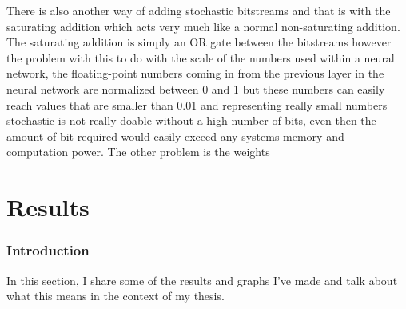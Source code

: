 \documentclass[a4paper,oneside,phd,etd]{BYUPhys}
\begin{document}
There is also another way of adding stochastic bitstreams and that is with the saturating addition which acts very much like a normal non-saturating addition. The saturating addition is simply an OR gate between the bitstreams  however the problem with this to do with the scale of the numbers used within a neural network, the floating-point numbers coming in from the previous layer in the neural network are normalized between 0 and 1 but these numbers can easily reach values that are smaller than 0.01 and representing really small numbers stochastic is not really doable without a high number of bits, even then the amount of bit required would easily exceed any systems memory and computation power. The other problem is the weights 


\chapter{Results}

\subsection{Introduction}
In this section, I share some of the results and graphs I've made and talk about what this means in the context of my thesis.
\end{document}
